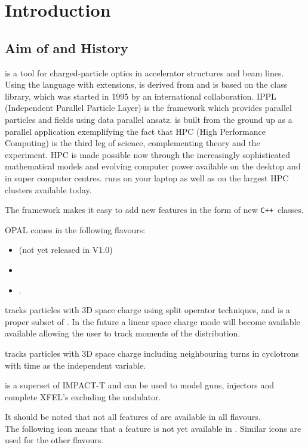 \chapter{Introduction}
\label{sec:Introduction}


\section{Aim of \opal and History}
\opal is a tool for charged-particle optics in
accelerator structures and beam lines. 
Using the \mad language with extensions, \opal is derived from \madninep and is based 
on the
 class library,
which was started in 1995 by an international collaboration.  IPPL (Independent Parallel Particle Layer) is
the framework which provides parallel particles and fields using data parallel ansatz. 
\opal is built from the ground up as a parallel application exemplifying the fact that HPC (High Performance Computing) 
is the third leg of science, complementing theory and the experiment. 
HPC is made possible now through the increasingly sophisticated mathematical models and evolving computer power available on the desktop
and in super computer centres. \opal runs on your laptop as well as on the largest HPC clusters available today. 

The \opal framework makes it easy to add new features in the form of new
\texttt{C++}~classes.

OPAL comes in the following flavours:
\begin{itemize}
\item \opalmap (not yet released in V1.0)
\item \opalcycl 
\item \opalt .
\end{itemize}

\opalmap tracks particles with 3D space charge using split operator techniques, and is a proper subset of \madninep. In the future 
a linear space charge mode will become available available
allowing the user to track moments of the distribution. 

\opalcycl tracks particles with 3D space charge including neighbouring turns in cyclotrons
with time as the independent variable. 

\opalt is a superset of IMPACT-T \cite{qiang2005} and can be used to model guns, injectors and complete XFEL's excluding the undulator.

It should be noted that not all features of \opal are available in all flavours.\\ The following icon \noopalt means that a feature is not yet 
available in \opalt. Similar icons are used for the other flavours. 

